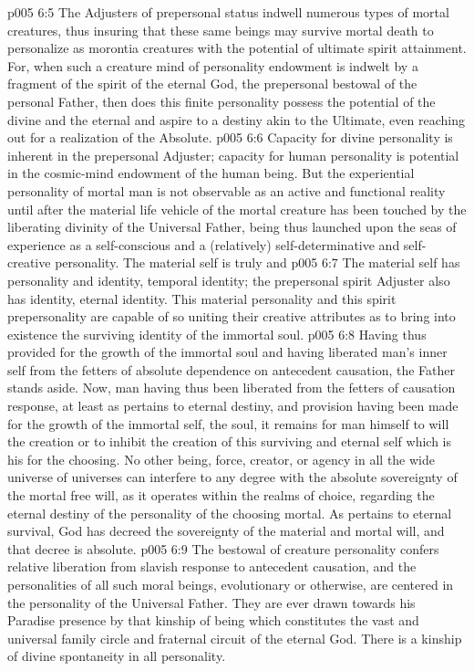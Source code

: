 \vs p005 6:5 \pc The Adjusters of prepersonal status indwell numerous types of mortal creatures, thus insuring that these same beings may survive mortal death to personalize as morontia creatures with the potential of ultimate spirit attainment. For, when such a creature mind of personality endowment is indwelt by a fragment of the spirit of the eternal God, the prepersonal bestowal of the personal Father, then does this finite personality possess the potential of the divine and the eternal and aspire to a destiny akin to the Ultimate, even reaching out for a realization of the Absolute.
\vs p005 6:6 Capacity for divine personality is inherent in the prepersonal Adjuster; capacity for human personality is potential in the cosmic\hyp{}mind endowment of the human being. But the experiential personality of mortal man is not observable as an active and functional reality until after the material life vehicle of the mortal creature has been touched by the liberating divinity of the Universal Father, being thus launched upon the seas of experience as a self\hyp{}conscious and a (relatively) self\hyp{}determinative and self\hyp{}creative personality. The material self is truly and 
\vs p005 6:7 \pc The material self has personality and identity, temporal identity; the prepersonal spirit Adjuster also has identity, eternal identity. This material personality and this spirit prepersonality are capable of so uniting their creative attributes as to bring into existence the surviving identity of the immortal soul.
\vs p005 6:8 Having thus provided for the growth of the immortal soul and having liberated man’s inner self from the fetters of absolute dependence on antecedent causation, the Father stands aside. Now, man having thus been liberated from the fetters of causation response, at least as pertains to eternal destiny, and provision having been made for the growth of the immortal self, the soul, it remains for man himself to will the creation or to inhibit the creation of this surviving and eternal self which is his for the choosing. No other being, force, creator, or agency in all the wide universe of universes can interfere to any degree with the absolute sovereignty of the mortal free will, as it operates within the realms of choice, regarding the eternal destiny of the personality of the choosing mortal. As pertains to eternal survival, God has decreed the sovereignty of the material and mortal will, and that decree is absolute.
\vs p005 6:9 \pc The bestowal of creature personality confers relative liberation from slavish response to antecedent causation, and the personalities of all such moral beings, evolutionary or otherwise, are centered in the personality of the Universal Father. They are ever drawn towards his Paradise presence by that kinship of being which constitutes the vast and universal family circle and fraternal circuit of the eternal God. There is a kinship of divine spontaneity in all personality.
